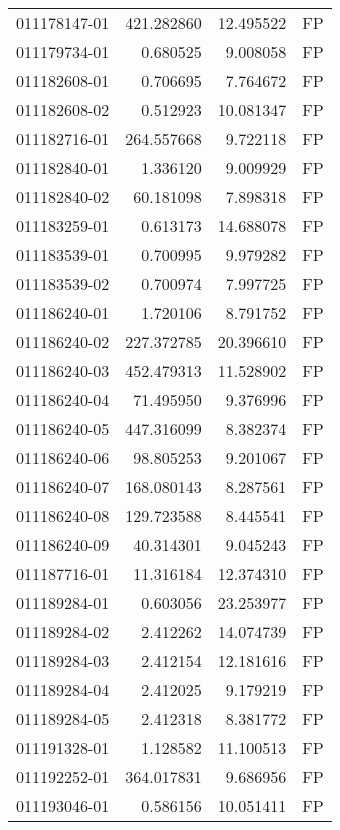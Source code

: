 \begin{tabular}{lrrl}
011178147-01 &  421.282860 &      12.495522 &   FP \\
011179734-01 &    0.680525 &       9.008058 &   FP \\
011182608-01 &    0.706695 &       7.764672 &   FP \\
011182608-02 &    0.512923 &      10.081347 &   FP \\
011182716-01 &  264.557668 &       9.722118 &   FP \\
011182840-01 &    1.336120 &       9.009929 &   FP \\
011182840-02 &   60.181098 &       7.898318 &   FP \\
011183259-01 &    0.613173 &      14.688078 &   FP \\
011183539-01 &    0.700995 &       9.979282 &   FP \\
011183539-02 &    0.700974 &       7.997725 &   FP \\
011186240-01 &    1.720106 &       8.791752 &   FP \\
011186240-02 &  227.372785 &      20.396610 &   FP \\
011186240-03 &  452.479313 &      11.528902 &   FP \\
011186240-04 &   71.495950 &       9.376996 &   FP \\
011186240-05 &  447.316099 &       8.382374 &   FP \\
011186240-06 &   98.805253 &       9.201067 &   FP \\
011186240-07 &  168.080143 &       8.287561 &   FP \\
011186240-08 &  129.723588 &       8.445541 &   FP \\
011186240-09 &   40.314301 &       9.045243 &   FP \\
011187716-01 &   11.316184 &      12.374310 &   FP \\
011189284-01 &    0.603056 &      23.253977 &   FP \\
011189284-02 &    2.412262 &      14.074739 &   FP \\
011189284-03 &    2.412154 &      12.181616 &   FP \\
011189284-04 &    2.412025 &       9.179219 &   FP \\
011189284-05 &    2.412318 &       8.381772 &   FP \\
011191328-01 &    1.128582 &      11.100513 &   FP \\
011192252-01 &  364.017831 &       9.686956 &   FP \\
011193046-01 &    0.586156 &      10.051411 &   FP \\

\end{tabular}
